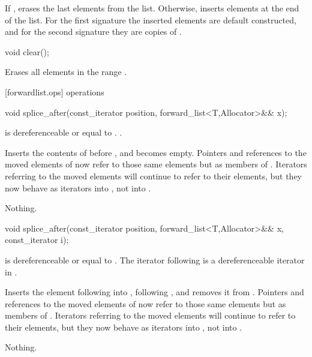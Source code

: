 \documentclass[american,twoside]{book}
\begin{document}
\begin{itemdescr}
\pnum
\effects If , erases the last  elements from the list. Otherwise, inserts  elements at the end of the list. For the first signature the inserted elements are default constructed, and for the second signature they are copies of .
\end{itemdescr}

\begin{itemdecl}
void clear();
\end{itemdecl}

\begin{itemdescr}
\pnum
\effects Erases all elements in the range .
\end{itemdescr}

[forwardlist.ops]{ operations}

\begin{itemdecl}
void splice_after(const_iterator position, forward_list<T,Allocator>&& x);
\end{itemdecl}

\begin{itemdescr}
\pnum
\requires {} is dereferenceable or equal to . .

\pnum
\effects Inserts the contents of  before , and  becomes empty. Pointers and references to the moved elements of  now refer to those same elements but as members of . Iterators referring to the moved elements will continue to refer to their elements, but they now behave as iterators into , not into .

\pnum
\throws Nothing.

\pnum
\complexity {}
\end{itemdescr}

\begin{itemdecl}
void splice_after(const_iterator position, forward_list<T,Allocator>&& x, const_iterator i);
\end{itemdecl}

\begin{itemdescr}
\pnum
\requires {} is dereferenceable or equal to . The iterator following  is a dereferenceable iterator in .

\pnum
\effects Inserts the element following  into , following , and removes it from . Pointers and references to the moved elements of  now refer to those same elements but as members of . Iterators referring to the moved elements will continue to refer to their elements, but they now behave as iterators into , not into .

\pnum
\throws Nothing.

\pnum
\complexity {}
\end{itemdescr}
\end{document}
